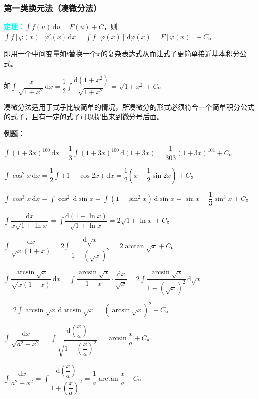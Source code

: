\documentclass[UTF8, 12pt]{ctexart}
\begin{document}
\subsubsection{第一类换元法（凑微分法）}

\textcolor{aqua}{\textbf{定理：}}$\int f(u)\,\textrm{d}u=F(u)+C$，则$\int f[\varphi(x)]\varphi'(x)\,\textrm{d}x=\int f[\varphi(x)]\,\textrm{d}\varphi(x)=F[\varphi(x)]+C$。

即用一个中间变量如$t$替换一个$x$的复杂表达式从而让式子更简单接近基本积分公式。

如$\displaystyle{\int\dfrac{x}{\sqrt{1+x^2}}\textrm{d}x=\dfrac{1}{2}\int\dfrac{\textrm{d}(1+x^2)}{\sqrt{1+x^2}}}=\sqrt{1+x^2}+C$。\medskip

凑微分法适用于式子比较简单的情况，所凑微分的形式必须符合一个简单积分公式的式子，且有一定的式子可以提出来到微分号后面。

\textbf{例题：}

$\int(1+3x)^{100}\,\textrm{d}x=\dfrac{1}{3}\int(1+3x)^{100}\,\textrm{d}(1+3x)=\dfrac{1}{303}(1+3x)^{101}+C$。

$\int\cos^2x\,\textrm{d}x=\dfrac{1}{2}\int(1+\cos 2x)\,\textrm{d}x=\dfrac{1}{2}\left(x+\dfrac{1}{2}\sin 2x\right)+C$。

$\int\cos^3x\,\textrm{d}x=\int\cos^2\,\textrm{d}\sin x=\int(1-\sin^2x)\,\textrm{d}\sin x=\sin x-\dfrac{1}{3}\sin^3x+C$。\medskip

$\displaystyle{\int\dfrac{\textrm{d}x}{x\sqrt{1+\ln x}}=\int\dfrac{\textrm{d}(1+\ln x)}{\sqrt{1+\ln x}}}=2\sqrt{1+\ln x}+C$。\medskip

$\displaystyle{\int\dfrac{\textrm{d}x}{\sqrt{x}(1+x)}=2\int\dfrac{\textrm{d}\sqrt{x}}{1+(\sqrt{x})^2}}=2\arctan\sqrt{x}+C$。\medskip

$\displaystyle{\int\dfrac{\arcsin\sqrt{x}}{\sqrt{x(1-x)}}\,\textrm{d}x=\int\dfrac{\arcsin\sqrt{x}}{1-x}\cdot\dfrac{\textrm{d}x}{\sqrt{x}}=2\int\dfrac{\arcsin\sqrt{x}}{1-(\sqrt{x})^2}\,\textrm{d}\sqrt{x}}$ \medskip

$=2\int\arcsin\sqrt{x}\,\textrm{d}\arcsin\sqrt{x}=(\arcsin\sqrt{x})^2+C$。\medskip

$\displaystyle{\int\dfrac{\textrm{d}x}{\sqrt{a^2-x^2}}}=\displaystyle{\int\dfrac{\textrm{d}\left(\dfrac{x}{a}\right)}{\sqrt{1-\left(\dfrac{x}{a}\right)^2}}}=\arcsin\dfrac{x}{a}+C$。

$\displaystyle{\int\dfrac{\textrm{d}x}{a^2+x^2}}=\displaystyle{\int\dfrac{\textrm{d}\left(\dfrac{x}{a}\right)}{1+\left(\dfrac{x}{a}\right)^2}}=\dfrac{1}{a}\arctan\dfrac{x}{a}+C$。\medskip
\end{document}
